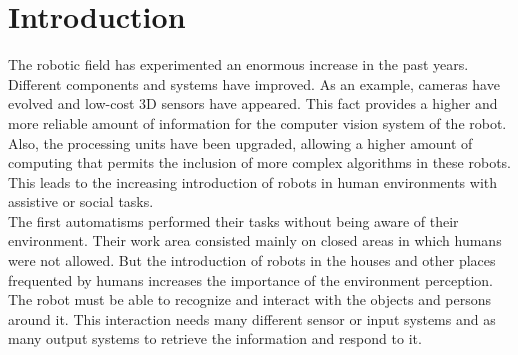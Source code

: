 \chapter{Introduction}
The robotic field has experimented an enormous increase in the past years. 
Different components and systems have improved.
As an example, cameras have evolved and low-cost 3D sensors have appeared. 
This fact provides a higher and more reliable amount of information for the computer vision system of the robot.  
Also, the processing units have been upgraded, allowing a higher amount of computing that permits the inclusion of more complex algorithms in these robots.  
This leads to the increasing introduction of robots in human environments with assistive or social tasks. 
\\


The first automatisms performed their tasks without being aware of their environment. 
Their work area consisted mainly on closed areas in which humans were not allowed. 
But the introduction of robots in the houses and other places frequented by humans increases the importance of the environment perception. 
The robot must be able to recognize and interact with the objects and persons around it. 
This interaction needs many different sensor or input systems and as many output systems to retrieve the information and respond to it.  
\\


